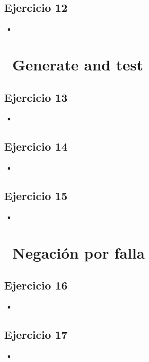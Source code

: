 \documentclass[10pt,a4paper]{article}
\begin{document}
\subsection{Ejercicio 12}
\begin{itemize}
\item
\end{itemize}
\section*{\ Generate and test}

\subsection{Ejercicio 13}
\begin{itemize}
\item
\end{itemize}

\subsection{Ejercicio 14}
\begin{itemize}
\item
\end{itemize}

\subsection{Ejercicio 15}
\begin{itemize}
\item
\end{itemize}
\section*{\ Negación por falla}

\subsection{Ejercicio 16}
\begin{itemize}
\item
\end{itemize}

\subsection{Ejercicio 17}
\begin{itemize}
\item
\end{itemize}
\end{document}
